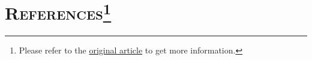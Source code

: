 \documentclass[10pt,a4paper,UTF8,fleqn]{article}
\begin{document}
\section*{\textsc{References\footnote{Please refer to the \hyperref{https://ieeexplore.ieee.org/document/1481431/}{}{}{original article} to get more information.}}}













\end{document}

